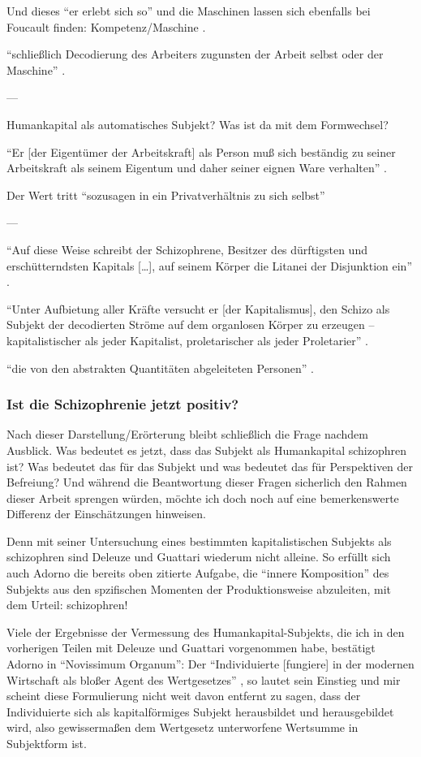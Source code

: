 \documentclass[12pt,
               DIV13,
               paper=a4,
               twoside=false,
               onehalfspacing,
               bibliography=totoc,
               toc=graduated,
               draft,
               ]{scrartcl}
\newcommand{\lips}{\dots\unkern}
\newcommand{\pc}[2]{\parencite[#1]{#2}}
\begin{document}
Und dieses "`er erlebt sich so"' und die Maschinen lassen sich
ebenfalls bei Foucault finden: Kompetenz/Maschine \pc{312+314}{gbp}.

"`schließlich Decodierung des Arbeiters zugunsten der Arbeit selbst
oder der Maschine"' \pc{289}{ao}.

---

Humankapital als automatisches Subjekt? Was ist da mit dem
Formwechsel?

"`Er [der Eigentümer der Arbeitskraft] als Person muß sich beständig
zu seiner Arbeitskraft als seinem Eigentum und daher seiner eignen
Ware verhalten"' \pc{182}{kap}.

Der Wert tritt "`sozusagen in ein Privatverhältnis zu sich selbst"'
\pc{169}{kap}

---

"`Auf diese Weise schreibt der Schizophrene, Besitzer des dürftigsten
und erschütterndsten Kapitals [\lips], auf seinem Körper die Litanei
der Disjunktion ein"' \pc{20}{ao}.

"`Unter Aufbietung aller Kräfte versucht er [der Kapitalismus], den
Schizo als Subjekt der decodierten Ströme auf dem organlosen Körper zu
erzeugen -- kapitalistischer als jeder Kapitalist, proletarischer als
jeder Proletarier"' \pc{S. 44 f.}{ao}.

"`die von den abstrakten Quantitäten abgeleiteten Personen"'
\pc{45}{ao}.

\subsubsection{Ist die Schizophrenie jetzt positiv?}

Nach dieser Darstellung/Erörterung bleibt schließlich die Frage
nachdem Ausblick. Was bedeutet es jetzt, dass das Subjekt als
Humankapital schizophren ist? Was bedeutet das für das Subjekt und was
bedeutet das für Perspektiven der Befreiung? Und während die
Beantwortung dieser Fragen sicherlich den Rahmen dieser Arbeit
sprengen würden, möchte ich doch noch auf eine bemerkenswerte
Differenz der Einschätzungen hinweisen.

Denn mit seiner Untersuchung eines bestimmten kapitalistischen
Subjekts als schizophren sind Deleuze und Guattari wiederum nicht
alleine. So erfüllt sich auch Adorno die bereits oben zitierte
Aufgabe, die "`innere Komposition"' \pc{261}{min} des Subjekts aus den
spzifischen Momenten der Produktionsweise abzuleiten, mit dem Urteil:
schizophren!

Viele der Ergebnisse der Vermessung des Humankapital-Subjekts, die ich
in den vorherigen Teilen mit Deleuze und Guattari vorgenommen habe,
bestätigt Adorno in "`Novissimum Organum"': Der "`Individuierte
[fungiere] in der modernen Wirtschaft als bloßer Agent des
Wertgesetzes"' \pc{261}{min}, so lautet sein Einstieg und mir scheint
diese Formulierung nicht weit davon entfernt zu sagen, dass der
Individuierte sich als kapitalförmiges Subjekt herausbildet und
herausgebildet wird, also gewissermaßen dem Wertgesetz unterworfene
Wertsumme in Subjektform ist.
\end{document}
